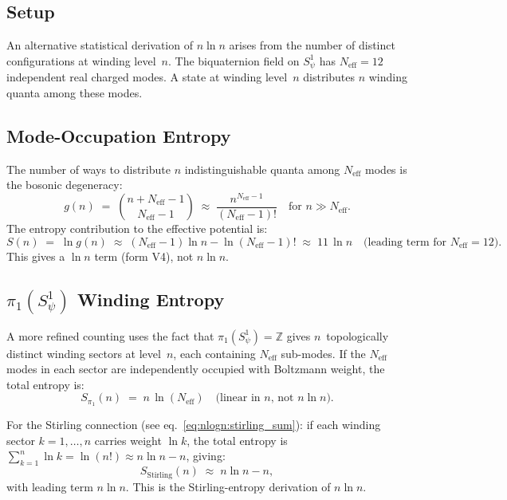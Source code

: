 \documentclass[12pt,a4paper]{article}
\theoremstyle{definition}
\theoremstyle{remark}
\newcommand{\ZZ}{\mathbb{Z}}
\newcommand{\Neff}{N_{\mathrm{eff}}}
\begin{document}
\subsection{Setup}
\label{ssec:nlogn:ent_setup}

An alternative statistical derivation of $n\ln n$ arises from the number of
distinct configurations at winding level~$n$.  The biquaternion field on
$S^1_\psi$ has $\Neff = 12$ independent real charged modes.  A state at
winding level~$n$ distributes $n$ winding quanta among these modes.

\subsection{Mode-Occupation Entropy}
\label{ssec:nlogn:ent_calc}

The number of ways to distribute $n$ indistinguishable quanta among $\Neff$
modes is the bosonic degeneracy:
\begin{equation}
  g(n) \;=\; \binom{n + \Neff - 1}{\Neff - 1}
  \;\approx\; \frac{n^{\Neff-1}}{(\Neff-1)!}
  \quad\text{for } n \gg \Neff.
  \label{eq:nlogn:degeneracy}
\end{equation}
The entropy contribution to the effective potential is:
\begin{equation}
  S(n) \;=\; \ln g(n)
  \;\approx\;
  (\Neff - 1)\ln n - \ln(\Neff - 1)!
  \;\approx\;
  11\,\ln n
  \quad\text{(leading term for }\Neff = 12\text{)}.
  \label{eq:nlogn:entropy_leading}
\end{equation}
This gives a $\ln n$ term (form V4), not $n\ln n$.

\subsection{$\pi_1(S^1_\psi)$ Winding Entropy}
\label{ssec:nlogn:pi1}

A more refined counting uses the fact that $\pi_1(S^1_\psi) = \ZZ$ gives
$n$~topologically distinct winding sectors at level~$n$, each containing
$\Neff$ sub-modes.  If the $\Neff$ modes in each sector are independently
occupied with Boltzmann weight, the total entropy is:
\begin{equation}
  S_{\pi_1}(n) \;=\; n\,\ln(\Neff)
  \quad\text{(linear in }n\text{, not }n\ln n\text{)}.
  \label{eq:nlogn:pi1_entropy}
\end{equation}

For the Stirling connection (see eq.~\eqref{eq:nlogn:stirling_sum}): if each
winding sector $k = 1,\ldots,n$ carries weight $\ln k$, the total entropy is
$\sum_{k=1}^n \ln k = \ln(n!) \approx n\ln n - n$, giving:
\begin{equation}
  S_\mathrm{Stirling}(n)
  \;\approx\;
  n\ln n - n,
  \label{eq:nlogn:stirling}
\end{equation}
with leading term $n\ln n$.  This is the Stirling-entropy derivation of $n\ln n$.
\end{document}
